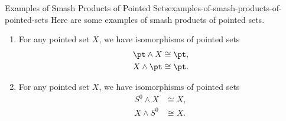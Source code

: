 \begin{example}{Examples of Smash Products of Pointed Sets}{examples-of-smash-products-of-pointed-sets}%
    Here are some examples of smash products of pointed sets.
    \begin{enumerate}
        \item\label{examples-of-smash-products-of-pointed-sets-smashing-with-pt}For any pointed set $X$, we have isomorphisms of pointed sets
            \begin{align*}
                \pt\wedge X &\cong \pt,\\
                X\wedge\pt  &\cong \pt.
            \end{align*}
        \item\label{examples-of-smash-products-of-pointed-sets-smashing-with-s-zero}For any pointed set $X$, we have isomorphisms of pointed sets
            \begin{align*}
                S^{0}\wedge X &\cong X,\\
                X\wedge S^{0} &\cong X.
            \end{align*}
    \end{enumerate}
\end{example}
